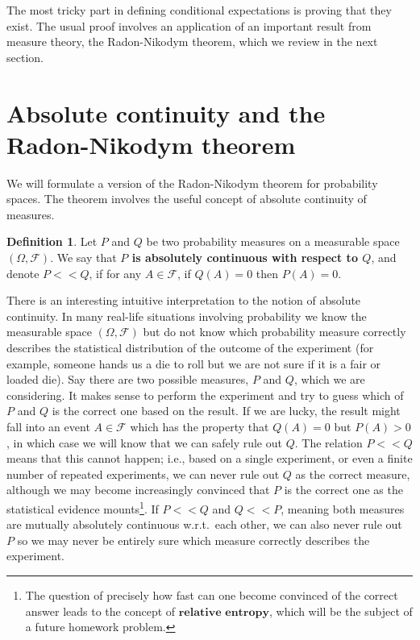 \documentclass[11pt]{report}
\theoremstyle{plain}
\theoremstyle{definition}
\newtheorem{defn}[thm]{Definition}
\begin{document}
The most tricky part in defining conditional expectations is proving that they exist. The usual proof involves an application of an important result from measure theory, the Radon-Nikodym theorem, which we review in the next section.

\section{Absolute continuity and the Radon-Nikodym theorem}
We will formulate a version of the Radon-Nikodym theorem for probability spaces. The theorem involves the useful concept of absolute continuity of measures.

\begin{defn}
Let $P$ and $Q$ be two probability measures on a measurable space $(\Omega, \mathcal{F})$. We say that \textbf{$P$ is absolutely continuous with respect to $Q$}, and denote $P<<Q$, if for any $A\in\mathcal{F}$, if $Q(A)=0$ then $P(A)=0$.
\end{defn}

There is an interesting intuitive interpretation to the notion of absolute continuity. In many real-life situations involving probability we know the measurable space $(\Omega, \mathcal{F})$ but do not know which probability measure correctly describes the statistical distribution of the outcome of the experiment (for example, someone hands us a die to roll but we are not sure if it is a fair or loaded die). Say there are two possible measures, $P$ and $Q$, which we are considering. It makes sense to perform the experiment and try to guess which of $P$ and $Q$ is the correct one based on the result. If we are lucky, the result might fall into an event $A \in \mathcal{F}$ which has the property that $Q(A)=0$ but $P(A)>0$, in which case we will know that we can safely rule out $Q$. The relation $P<<Q$ means that this cannot happen; i.e., based on a single experiment, or even a finite number of repeated experiments, we can never rule out $Q$ as the correct measure, although we may become increasingly convinced that $P$ is the correct one as the statistical evidence mounts\footnote{The question of precisely how fast can one become convinced of the correct answer leads to the concept of $\textbf{relative entropy}$, which will be the subject of a future homework problem.}. If $P<<Q$ and $Q<<P$, meaning both measures are mutually absolutely continuous w.r.t.\ each other, we can also never rule out $P$ so we may never be entirely sure which measure correctly describes the experiment.
\end{document}
